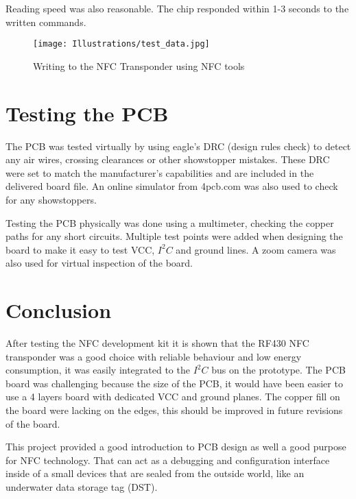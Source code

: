 Reading speed was also reasonable. The chip responded within 1-3 seconds to the written commands.
\begin{figure}[h]
\begin{center}
\center
\texttt{[image: Illustrations/test\_data.jpg]}  
\caption{Writing to the NFC Transponder using NFC tools}
\label{write_nfc}
\end{center}
\end{figure}


\section{Testing the PCB}
The PCB was tested virtually by using eagle's DRC (design rules check) to detect any air wires, crossing clearances or other showstopper mistakes. These DRC were set to match the manufacturer’s capabilities and are included in the delivered board file. An online simulator from 4pcb.com was also used to check for any showstoppers.

Testing the PCB physically was done using a multimeter, checking the copper paths for any short circuits. Multiple test points were added when designing the board to make it easy to test VCC, $I^2C$ and ground lines.  A zoom camera was also used for virtual inspection of the board.

\section{Conclusion}
After testing the NFC development kit it is shown that the RF430 NFC transponder was a good choice with reliable behaviour and low energy consumption, it was easily integrated to the $I^2C$ bus on the prototype. The PCB board was challenging because the size of the PCB, it would have been easier to use a 4 layers board with dedicated VCC and ground planes. The copper fill on the board were lacking on the edges, this should be improved in future revisions of the board. 

This project provided a good introduction to PCB design as well a good purpose for NFC technology. 
That can act as a debugging and configuration interface inside of a small devices that are sealed from the outside world, like an underwater data storage tag (DST).
